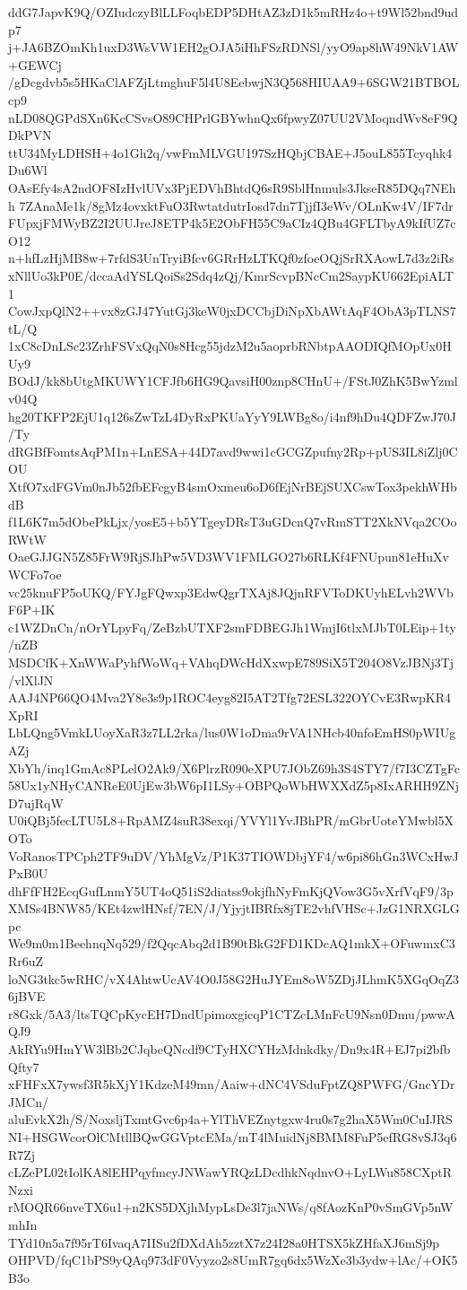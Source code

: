 ddG7JapvK9Q/OZIudczyBlLLFoqbEDP5DHtAZ3zD1k5mRHz4o+t9Wl52bnd9udp7
j+JA6BZOmKh1uxD3WsVW1EH2gOJA5iHhFSzRDNSl/yyO9ap8hW49NkV1AW+GEWCj
/gDcgdvb5s5HKaClAFZjLtmghuF5l4U8EebwjN3Q568HIUAA9+6SGW21BTBOLcp9
nLD08QGPdSXn6KcCSvsO89CHPrlGBYwhnQx6fpwyZ07UU2VMoqndWv8eF9QDkPVN
ttU34MyLDHSH+4o1Gh2q/vwFmMLVGU197SzHQbjCBAE+J5ouL855Tcyqhk4Du6Wl
OAsEfy4sA2ndOF8IzHvlUVx3PjEDVhBhtdQ6sR9SblHnmuls3JkseR85DQq7NEhh
7ZAnaMe1k/8gMz4ovxktFuO3RwtatdutrIosd7dn7TjjfI3eWv/OLnKw4V/IF7dr
FUpxjFMWyBZ2I2UUJreJ8ETP4k5E2ObFH55C9aCIz4QBu4GFLTbyA9kIfUZ7cO12
n+hfLzHjMB8w+7rfdS3UnTryiBfcv6GRrHzLTKQf0zfoeOQjSrRXAowL7d3z2iRs
xNllUo3kP0E/dccaAdYSLQoiSs2Sdq4zQj/KmrScvpBNcCm2SaypKU662EpiALT1
CowJxpQlN2++vx8zGJ47YutGj3keW0jxDCCbjDiNpXbAWtAqF4ObA3pTLNS7tL/Q
1xC8cDnLSc23ZrhFSVxQqN0s8Hcg55jdzM2u5aoprbRNbtpAAODIQfMOpUx0HUy9
BOdJ/kk8bUtgMKUWY1CFJfb6HG9QavsiH00znp8CHnU+/FStJ0ZhK5BwYzmlv04Q
hg20TKFP2EjU1q126sZwTzL4DyRxPKUaYyY9LWBg8o/i4nf9hDu4QDFZwJ70J/Ty
dRGBfFomtsAqPM1n+LnESA+44D7avd9wwi1cGCGZpufny2Rp+pUS3IL8iZlj0COU
XtfO7xdFGVm0nJb52fbEFcgyB4smOxmeu6oD6fEjNrBEjSUXCswTox3pekhWHbdB
f1L6K7m5dObePkLjx/yosE5+b5YTgeyDRsT3uGDcnQ7vRmSTT2XkNVqa2COoRWtW
OaeGJJGN5Z85FrW9RjSJhPw5VD3WV1FMLGO27b6RLKf4FNUpun81eHuXvWCFo7oe
vc25knuFP5oUKQ/FYJgFQwxp3EdwQgrTXAj8JQjnRFVToDKUyhELvh2WVbF6P+IK
c1WZDnCn/nOrYLpyFq/ZeBzbUTXF2smFDBEGJh1WmjI6tlxMJbT0LEip+1ty/nZB
MSDCfK+XnWWaPyhfWoWq+VAhqDWcHdXxwpE789SiX5T204O8VzJBNj3Tj/vlXlJN
AAJ4NP66QO4Mva2Y8e3s9p1ROC4eyg82I5AT2Tfg72ESL322OYCvE3RwpKR4XpRI
LbLQng5VmkLUoyXaR3z7LL2rka/lus0W1oDma9rVA1NHcb40nfoEmHS0pWIUgAZj
XbYh/inq1GmAc8PLelO2Ak9/X6PlrzR090eXPU7JObZ69h3S4STY7/f7I3CZTgFc
58Ux1yNHyCANReE0UjEw3bW6pI1LSy+OBPQoWbHWXXdZ5p8IxARHH9ZNjD7ujRqW
U0iQBj5fecLTU5L8+RpAMZ4suR38exqi/YVYl1YvJBhPR/mGbrUoteYMwbl5XOTo
VoRanosTPCph2TF9uDV/YhMgVz/P1K37TIOWDbjYF4/w6pi86hGn3WCxHwJPxB0U
dhFfFH2EcqGufLnmY5UT4oQ51iS2diatss9okjfhNyFmKjQVow3G5vXrfVqF9/3p
XMSs4BNW85/KEt4zwlHNsf/7EN/J/YjyjtIBRfx8jTE2vhfVHSc+JzG1NRXGLGpc
We9m0m1BeehnqNq529/f2QqcAbq2d1B90tBkG2FD1KDcAQ1mkX+OFuwmxC3Rr6uZ
loNG3tkc5wRHC/vX4AhtwUcAV4O0J58G2HuJYEm8oW5ZDjJLhmK5XGqOqZ36jBVE
r8Gxk/5A3/ltsTQCpKycEH7DndUpimoxgicqP1CTZcLMnFcU9Nsn0Dmu/pwwAQJ9
AkRYu9HmYW3lBb2CJqbeQNcdf9CTyHXCYHzMdnkdky/Dn9x4R+EJ7pi2bfbQfty7
xFHFxX7ywsf3R5kXjY1KdzeM49mn/Aaiw+dNC4VSduFptZQ8PWFG/GncYDrJMCn/
aluEvkX2h/S/NoxsljTxmtGvc6p4a+YlThVEZnytgxw4ru0s7g2haX5Wm0CuIJRS
NI+HSGWcorOlCMtllBQwGGVptcEMa/mT4lMuidNj8BMM8FuP5efRG8vSJ3q6R7Zj
cLZePL02tIolKA8lEHPqyfmcyJNWawYRQzLDcdhkNqdnvO+LyLWu858CXptRNzxi
rMOQR66nveTX6u1+n2KS5DXjhMypLsDe3l7jaNWs/q8fAozKnP0vSmGVp5nWmhIn
TYd10n5a7f95rT6IvaqA7IISu2fDXdAh5zztX7z24I28a0HTSX5kZHfaXJ6mSj9p
OHPVD/fqC1bPS9yQAq973dF0Vyyzo2s8UmR7gq6dx5WzXe3b3ydw+lAc/+OK5B3o
